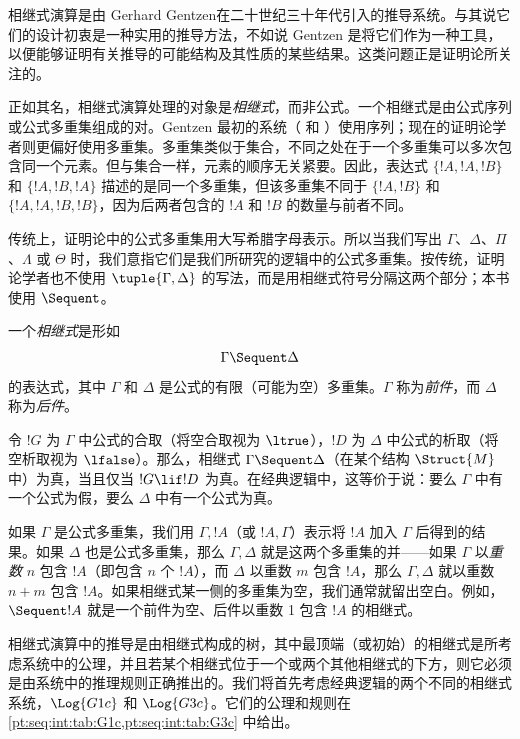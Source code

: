 \documentclass[../../../include/open-logic-section]{subfiles}
\begin{document}


相继式演算是由 Gerhard Gentzen在二十世纪三十年代引入的推导系统。与其说它们的设计初衷是一种实用的推导方法，不如说 Gentzen 是将它们作为一种工具，以便能够证明有关推导的可能结构及其性质的某些结果。这类问题正是证明论所关注的。

正如其名，相继式演算处理的对象是\emph{相继式}，而非公式。一个相继式是由公式序列或公式多重集组成的对。Gentzen 最初的系统（ 和 ）使用序列；现在的证明论学者则更偏好使用多重集。多重集类似于集合，不同之处在于一个多重集可以多次包含同一个元素。但与集合一样，元素的顺序无关紧要。因此，表达式 $\{!A, !A, !B\}$ 和 $\{!A, !B, !A\}$ 描述的是同一个多重集，但该多重集不同于 $\{!A, !B\}$ 和 $\{!A, !A, !B, !B\}$，因为后两者包含的 $!A$ 和 $!B$ 的数量与前者不同。

传统上，证明论中的公式多重集用大写希腊字母表示。所以当我们写出 $\Gamma$、$\Delta$、$\Pi$、$\Lambda$ 或 $\Theta$ 时，我们意指它们是我们所研究的逻辑中的公式多重集。按传统，证明论学者也不使用 $\tuple{\Gamma, \Delta}$ 的写法，而是用相继式符号分隔这两个部分；本书使用 $\Sequent$。

\begin{defn}[相继式]
一个\emph{相继式}是形如
\[
\Gamma \Sequent \Delta
\]
的表达式，其中 $\Gamma$ 和 $\Delta$ 是公式的有限（可能为空）多重集。$\Gamma$ 称为\emph{前件}，而 $\Delta$ 称为\emph{后件}。
\end{defn}

令 $!G$ 为 $\Gamma$ 中公式的合取（将空合取视为 $\ltrue$），$!D$ 为 $\Delta$ 中公式的析取（将空析取视为 $\lfalse$）。那么，相继式 $\Gamma \Sequent \Delta$（在某个结构 $\Struct{M}$ 中）为真，当且仅当 $!G \lif !D$ 为真。在经典逻辑中，这等价于说：要么 $\Gamma$ 中有一个公式为假，要么 $\Delta$ 中有一个公式为真。

如果 $\Gamma$ 是公式多重集，我们用 $\Gamma, !A$（或 $!A, \Gamma$）表示将 $!A$ 加入 $\Gamma$ 后得到的结果。如果 $\Delta$ 也是公式多重集，那么 $\Gamma, \Delta$ 就是这两个多重集的并——如果 $\Gamma$ 以\emph{重数} $n$ 包含 $!A$（即包含 $n$ 个 $!A$），而 $\Delta$ 以重数 $m$ 包含 $!A$，那么 $\Gamma, \Delta$ 就以重数 $n+m$ 包含 $!A$。如果相继式某一侧的多重集为空，我们通常就留出空白。例如，$\Sequent !A$ 就是一个前件为空、后件以重数 1 包含 $!A$ 的相继式。

相继式演算中的推导是由相继式构成的树，其中最顶端（或初始）的相继式是所考虑系统中的公理，并且若某个相继式位于一个或两个其他相继式的下方，则它必须是由系统中的推理规则正确推出的。我们将首先考虑经典逻辑的两个不同的相继式系统，$\Log{G1c}$ 和 $\Log{G3c}$。它们的公理和规则在 \cref{pt:seq:int:tab:G1c,pt:seq:int:tab:G3c} 中给出。
\end{document}
